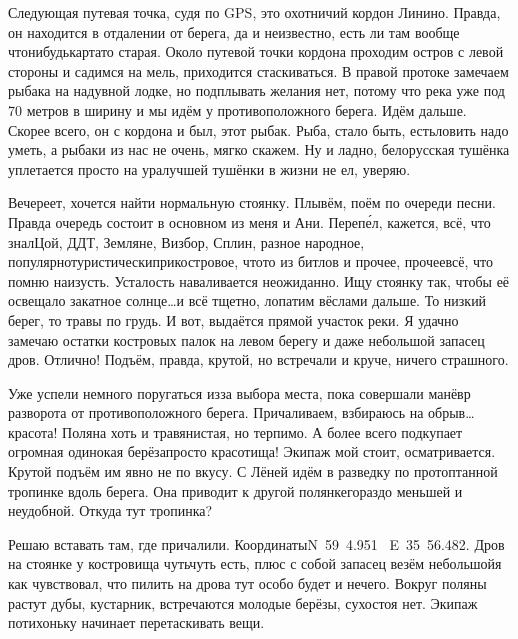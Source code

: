Следующая путевая точка, судя по GPS, это охотничий кордон Линино. Правда, он находится в отдалении от берега, да и неизвестно, есть ли там вообще что\sdash нибудь\mdash карта\sdash то старая. Около путевой точки кордона проходим остров с левой стороны и садимся на мель, приходится стаскиваться. В правой протоке замечаем рыбака на надувной лодке, но подплывать желания нет, потому что река уже под 70 метров в ширину и мы идём у противоположного берега. Идём дальше. Скорее всего, он с кордона и был, этот рыбак. Рыба, стало быть, есть\mdash ловить надо уметь, а рыбаки из нас не очень, мягко скажем. Ну и ладно, белорусская тушёнка уплетается просто на ура\mdash лучшей тушёнки в жизни не ел, уверяю.

Вечереет, хочется найти нормальную стоянку. Плывём, поём по очереди песни. Правда очередь состоит в основном из меня и Ани. Переп\'{е}л, кажется, всё, что знал\mdash Цой, ДДТ, Земляне, Визбор, Сплин, разное народное, популярно\sdash туристически\sdash прикостровое, что\sdash то из битлов и прочее, прочее\mdash всё, что помню наизусть. Усталость наваливается неожиданно. Ищу стоянку так, чтобы её освещало закатное солнце\ldots и всё тщетно, лопатим вёслами дальше. То низкий берег, то травы по грудь. И вот, выдаётся прямой участок реки. Я удачно замечаю остатки костровых палок на левом берегу и даже небольшой запасец дров. Отлично! Подъём, правда, крутой, но встречали и круче, ничего страшного.

Уже успели немного поругаться из\sdash за выбора места, пока совершали манёвр разворота от противоположного берега. Причаливаем, взбираюсь на обрыв\ldots красота! Поляна хоть и травянистая, но терпимо. А более всего подкупает огромная одинокая берёза\mdash просто красотища! Экипаж мой стоит, осматривается. Крутой подъём им явно не по вкусу. С Лёней идём в разведку по протоптанной тропинке вдоль берега. Она приводит к другой полянке\mdash гораздо меньшей и неудобной. Откуда тут тропинка? 

Решаю вставать там, где причалили. Координаты\mdash N~59\degree~4.951\textprime~ E~35\degree~56.482\textprime. Дров на стоянке у костровища чуть\sdash чуть есть, плюс с собой запасец везём небольшой\mdash я как чувствовал, что пилить на дрова тут особо будет и нечего. Вокруг поляны растут дубы, кустарник, встречаются молодые берёзы, сухостоя нет. Экипаж потихоньку начинает перетаскивать вещи. 

